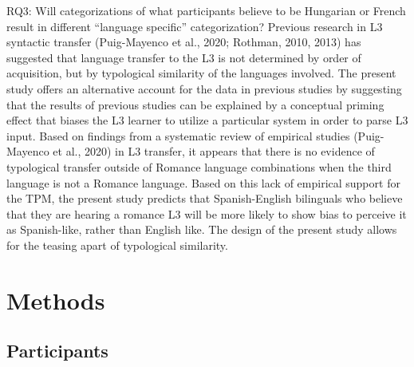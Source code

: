 \documentclass[
  man]{apa6}
\begin{document}
RQ3: Will categorizations of what participants believe to be Hungarian or French result in different ``language specific'' categorization?
Previous research in L3 syntactic transfer (Puig-Mayenco et al., 2020; Rothman, 2010, 2013) has suggested that language transfer to the L3 is not determined by order of acquisition, but by typological similarity of the languages involved.
The present study offers an alternative account for the data in previous studies by suggesting that the results of previous studies can be explained by a conceptual priming effect that biases the L3 learner to utilize a particular system in order to parse L3 input.
Based on findings from a systematic review of empirical studies (Puig-Mayenco et al., 2020) in L3 transfer, it appears that there is no evidence of typological transfer outside of Romance language combinations when the third language is not a Romance language.
Based on this lack of empirical support for the TPM, the present study predicts that Spanish-English bilinguals who believe that they are hearing a romance L3 will be more likely to show bias to perceive it as Spanish-like, rather than English like.
The design of the present study allows for the teasing apart of typological similarity.

\hypertarget{methods}{%
\section{Methods}\label{methods}}

\hypertarget{participants}{%
\subsection{Participants}\label{participants}}
\end{document}
